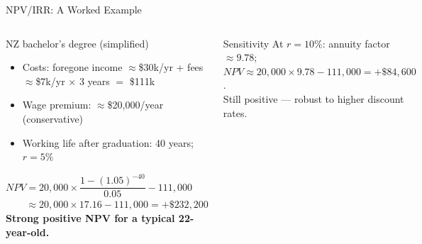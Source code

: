 \documentclass[aspectratio=169, 12pt]{beamer}
\begin{document}
\begin{frame}{NPV/IRR: A Worked Example}
  \begin{columns}
      \begin{block}{NZ bachelor's degree (simplified)}
        \footnotesize
        \begin{itemize}
          \item Costs: foregone income $\approx$\$30k/yr + fees $\approx$\$7k/yr $\times$ 3 years $=$ \$111k
          \item Wage premium: $\approx$\$20,000/year (conservative)
          \item Working life after graduation: 40 years; $r = 5\%$
        \end{itemize}
        \vspace{0.2em}
        \footnotesize $NPV = 20{,}000 \times \dfrac{1-(1.05)^{-40}}{0.05} - 111{,}000$\\[0.3em]
        $\phantom{NPV} \approx 20{,}000 \times 17.16 - 111{,}000 = +\$232{,}200$\\[0.2em]
        \textbf{Strong positive NPV for a typical 22-year-old.}
      \end{block}
      \begin{alertblock}{Sensitivity}
        \footnotesize At $r = 10\%$: annuity factor $\approx 9.78$;\\
        $NPV \approx 20{,}000 \times 9.78 - 111{,}000 = +\$84{,}600$.\\[0.2em]
        Still positive --- robust to higher discount rates.
      \end{alertblock}
  \end{columns}
\end{frame}
\end{document}
